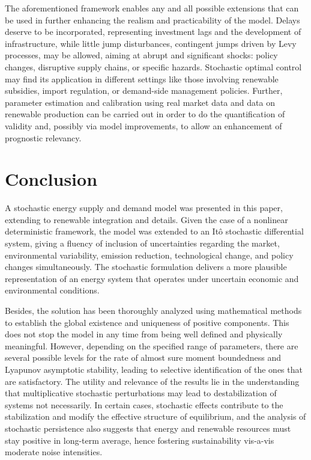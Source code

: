 \documentclass[11pt]{article}
\numberwithin{equation}{section}
\begin{document}
The aforementioned framework enables any and all possible extensions that can be used in further enhancing the realism and practicability of the model. Delays deserve to be incorporated, representing investment lags and the development of infrastructure, while little jump disturbances, contingent jumps driven by Levy processes, may be allowed, aiming at abrupt and significant shocks: policy changes, disruptive supply chains, or specific hazards. Stochastic optimal control may find its application in different settings like those involving renewable subsidies, import regulation, or demand-side management policies. Further, parameter estimation and calibration using real market data and data on renewable production can be carried out in order to do the quantification of validity and, possibly via model improvements, to allow an enhancement of prognostic relevancy.\\

\section{Conclusion}

A stochastic energy supply and demand model was presented in this paper, extending to renewable integration and details. Given the case of a nonlinear deterministic framework, the model was extended to an Itô stochastic differential system, giving a fluency of inclusion of uncertainties regarding the market, environmental variability, emission reduction, technological change, and policy changes simultaneously. The stochastic formulation delivers a more plausible representation of an energy system that operates under uncertain economic and environmental conditions.

Besides, the solution has been thoroughly analyzed using mathematical methods to establish the global existence and uniqueness of positive components. This does not stop the model in any time from being well defined and physically meaningful. However, depending on the specified range of parameters, there are several possible levels for the rate of almost sure moment boundedness and Lyapunov asymptotic stability, leading to selective identification of the ones that are satisfactory. The utility and relevance of the results lie in the understanding that multiplicative stochastic perturbations may lead to destabilization of systems not necessarily. In certain cases, stochastic effects contribute to the stabilization and modify the effective structure of equilibrium, and the analysis of stochastic persistence also suggests that energy and renewable resources must stay positive in long-term average, hence fostering sustainability vis-a-vis moderate noise intensities.
\end{document}
